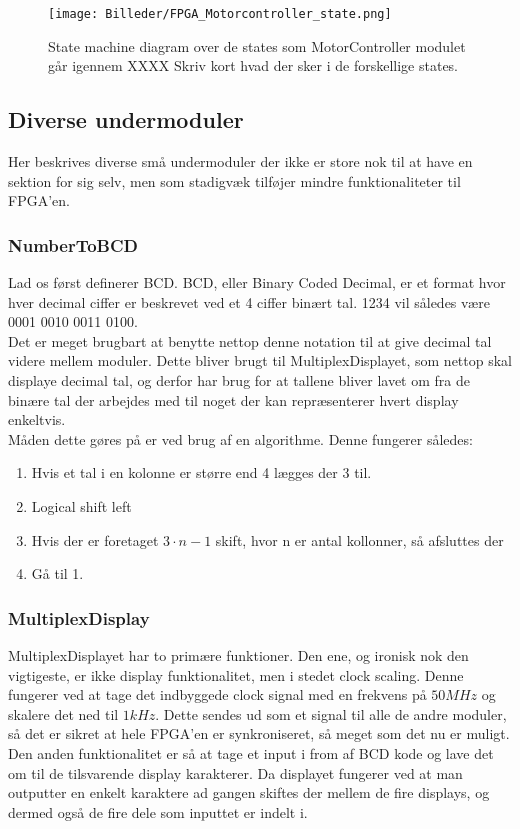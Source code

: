 \begin{figure}[ht]
	\begin{center}
		\texttt{[image: Billeder/FPGA\_Motorcontroller\_state.png]}
	\end{center}
\caption{State machine diagram over de states som MotorController modulet går igennem XXXX Skriv kort hvad der sker i de forskellige states.}
\label{fig:FPGA_MotorController_State}
\end{figure}

\subsection{Diverse undermoduler}
Her beskrives diverse små undermoduler der ikke er store nok til at have en sektion for sig selv, men som stadigvæk tilføjer mindre funktionaliteter til FPGA'en.

\subsubsection{NumberToBCD}

Lad os først definerer BCD. BCD, eller Binary Coded Decimal, er et format hvor hver decimal ciffer er beskrevet ved et 4 ciffer binært tal. 1234 vil således være 0001 0010 0011 0100.
\\
Det er meget brugbart at benytte nettop denne notation til at give decimal tal videre mellem moduler. Dette bliver brugt til MultiplexDisplayet, som nettop skal displaye decimal tal, og derfor har brug for at tallene bliver lavet om fra de binære tal der arbejdes med til noget der kan repræsenterer hvert display enkeltvis.
\\
Måden dette gøres på er ved brug af en algorithme. Denne fungerer således:

\begin{enumerate}
\item Hvis et tal i en kolonne er større end 4 lægges der 3 til.
\item Logical shift left
\item Hvis der er foretaget $3 \cdot n - 1$ skift, hvor n er antal kollonner, så afsluttes der
\item Gå til 1.
\end{enumerate}

\subsubsection{MultiplexDisplay}

MultiplexDisplayet har to primære funktioner. Den ene, og ironisk nok den vigtigeste, er ikke display funktionalitet, men i stedet clock scaling. Denne fungerer ved at tage det indbyggede clock signal med en frekvens på $50 MHz$ og skalere det ned til $1 kHz$. Dette sendes ud som et signal til alle de andre moduler, så det er sikret at hele FPGA'en er synkroniseret, så meget som det nu er muligt.
\\
Den anden funktionalitet er så at tage et input i from af BCD kode og lave det om til de tilsvarende display karakterer. Da displayet fungerer ved at man outputter en enkelt karaktere ad gangen skiftes der mellem de fire displays, og dermed også de fire dele som inputtet er indelt i.

